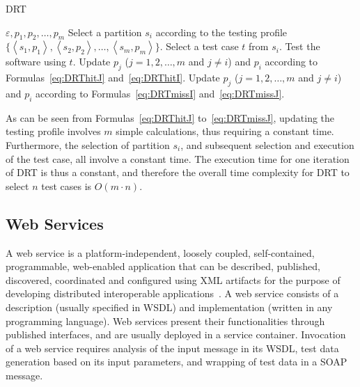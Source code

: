 \documentclass[10pt,journal,compsoc]{IEEEtran}
\begin{document}
\begin{algorithm}
    \caption{DRT}
    \label{alg:DRT}
    \begin{algorithmic}[1]
        \renewcommand{\algorithmicrequire}{\textbf{Input:}} %
	    \renewcommand{\algorithmicensure}{\textbf{Output:}}
        \renewcommand{\algorithmicendwhile}{\algorithmicend\_\algorithmicwhile}
		\renewcommand{\algorithmicendfor}{\algorithmicend\_\algorithmicfor}
		\renewcommand{\algorithmicendif}{\algorithmicend\_\algorithmicif}
		\renewcommand{\algorithmicthen}{}
		\renewcommand{\algorithmicdo}{}
        \REQUIRE $\varepsilon, p_1, p_2, \ldots, p_m$
        \STATE Select a partition $s_i$ according to the testing profile $\{ \left \langle s_1,p_1 \right \rangle, \left \langle s_2,p_2 \right \rangle, \ldots, \left \langle s_m,p_m \right \rangle\}$.
        \STATE Select a test case $t$ from $s_i$.
        \STATE Test the software using $t$.
        \STATE Update $p_j$ ($j = 1, 2, \ldots, m$ and $j \neq i$) and $p_i$ according to Formulas~\ref{eq:DRThitJ} and~\ref{eq:DRThitI}.
        \ELSE
        \STATE Update $p_j$ ($j = 1, 2, \ldots, m$ and $j \neq i$) and $p_i$ according to Formulas~\ref{eq:DRTmissI} and~\ref{eq:DRTmissJ}.
        \ENDIF
        \ENDWHILE
    \end{algorithmic}
\end{algorithm}

As can be seen from Formulas~\ref{eq:DRThitJ} to~\ref{eq:DRTmissJ},  updating the testing profile involves $m$ simple calculations, thus requiring a constant time.
Furthermore, the selection of partition $s_i$, and subsequent selection and execution of the test case, all involve a constant time.
The execution time for one iteration of DRT is thus a constant, and therefore the overall time complexity for DRT to select $n$ test cases is $O(m \cdot n)$.

\subsection{Web Services}
\label{sec:webservices}

A web service is a platform-independent, loosely coupled, self-contained, programmable, web-enabled application that can be described, published, discovered, coordinated and configured using XML artifacts for the purpose of developing distributed interoperable applications~\cite{papazoglou2008service}.
A web service consists of a description (usually specified in WSDL) and implementation (written in any programming language).
Web services present their functionalities through published interfaces, and are usually deployed in a service container.
Invocation of a web service requires analysis of the input message in its WSDL, test data generation based on its input parameters, and wrapping of test data in a SOAP message.
\end{document}
